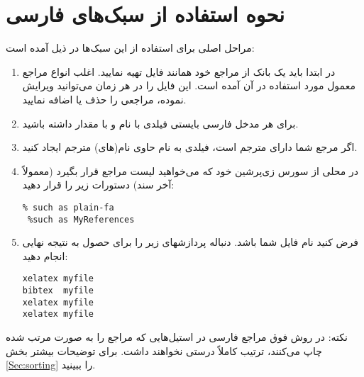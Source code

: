 \documentclass[a4paper]{article}
\theoremstyle{plain}\newtheorem{question}{پرسش}
\begin{document}
\section{ نحوه استفاده از سبک‌های فارسی}
 مراحل اصلی برای استفاده از این سبک‌ها در ذیل آمده است:
\begin{enumerate}
\item در ابتدا باید یک بانک از مراجع خود همانند فایل  تهیه نمایید. اغلب انواع مراجع معمول مورد استفاده در آن آمده است. این فایل را در هر زمان می‌توانید ویرایش نموده، مراجعی را حذف یا اضافه نمایید.
\item برای هر مدخل فارسی بایستی فیلدی با نام  و با مقدار  داشته باشید.
\item اگر مرجع شما دارای مترجم است، فیلدی به نام  حاوی نام(های) مترجم ایجاد کنید.
\item در محلی از سورس زی‌پرشین خود که می‌خواهید لیست مراجع قرار بگیرد (معمولاً آخر سند) دستورات زیر را قرار دهید:
\begin{LTR}
\begin{verbatim}
% such as plain-fa 
 %such as MyReferences
\end{verbatim}
\end{LTR}
\item فرض کنید نام فایل شما   باشد. دنباله پردازشهای زیر را برای حصول به نتیجه نهایی انجام دهید:

\begin{LTR}
\begin{verbatim}
xelatex myfile  
bibtex  myfile  
xelatex myfile  
xelatex myfile  
\end{verbatim}
\end{LTR}
\end{enumerate}
نکته: در روش فوق مراجع فارسی در استیل‌هایی که مراجع را به صورت مرتب شده چاپ می‌کنند، ترتیب کاملاً درستی نخواهند داشت. برای توضیحات بیشتر بخش‌ \ref{Sec:sorting} را ببینید.
\end{document}
